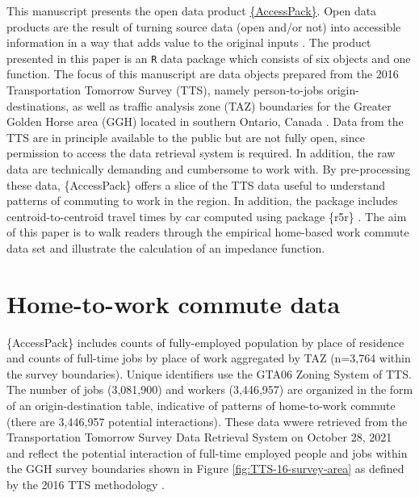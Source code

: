 \documentclass[Royal,times,sageh]{sagej}
\begin{document}
This manuscript presents the open data product
\href{https://github.com/soukhova/AccessPack}{\{AccessPack\}}. Open data
products are the result of turning source data (open and/or not) into
accessible information in a way that adds value to the original inputs
\citep[see][]{Arribas2021open}. The product presented in this paper is
an \texttt{R} data package which consists of six objects and one
function. The focus of this manuscript are data objects prepared from
the 2016 Transportation Tomorrow Survey (TTS), namely person-to-jobs
origin-destinations, as well as traffic analysis zone (TAZ) boundaries
for the Greater Golden Horse area (GGH) located in southern Ontario,
Canada \citep{data_management_group_tts_2018}. Data from the TTS are in
principle available to the public but are not fully open, since
permission to access the data retrieval system is required. In addition,
the raw data are technically demanding and cumbersome to work with. By
pre-processing these data, \{AccessPack\} offers a slice of the TTS data
useful to understand patterns of commuting to work in the region. In
addition, the package includes centroid-to-centroid travel times by car
computed using package \{r5r\} \citep{Pereira2021r5r}. The aim of this
paper is to walk readers through the empirical home-based work commute
data set and illustrate the calculation of an impedance function.

\hypertarget{home-to-work-commute-data}{%
\section{Home-to-work commute data}\label{home-to-work-commute-data}}

\{AccessPack\} includes counts of fully-employed population by place of
residence and counts of full-time jobs by place of work aggregated by
TAZ (n=3,764 within the survey boundaries). Unique identifiers use the
GTA06 Zoning System of TTS. The number of jobs (3,081,900) and workers
(3,446,957) are organized in the form of an origin-destination table,
indicative of patterns of home-to-work commute (there are 3,446,957
potential interactions). These data wwere retrieved from the
Transportation Tomorrow Survey Data Retrieval System on October 28, 2021
and reflect the potential interaction of full-time employed people and
jobs within the GGH survey boundaries shown in Figure
\ref{fig:TTS-16-survey-area} as defined by the 2016 TTS methodology
\citep{data_management_group_tts_2018}.
\end{document}
